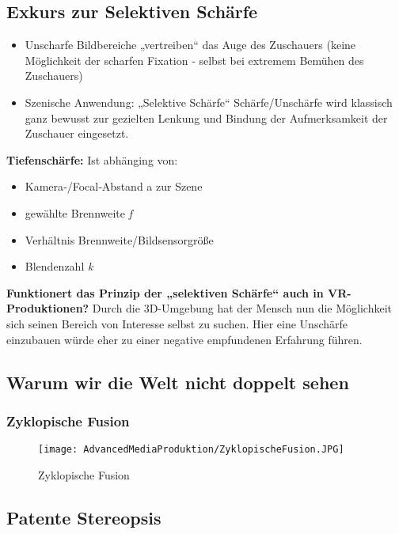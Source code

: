\subsection{Exkurs zur Selektiven Schärfe}

\begin{itemize}
\item Unscharfe Bildbereiche „vertreiben“ das Auge des Zuschauers
(keine Möglichkeit der scharfen Fixation ‐ selbst bei extremem Bemühen des Zuschauers)
\item Szenische Anwendung: „Selektive Schärfe“
Schärfe/Unschärfe wird klassisch ganz bewusst zur gezielten Lenkung und Bindung der Aufmerksamkeit der Zuschauer eingesetzt.
\end{itemize}

\textbf{Tiefenschärfe:}
Ist abhänging von: 
\begin{itemize}
\item Kamera‐/Focal‐Abstand a zur Szene
\item gewählte Brennweite \textit{f} 
\item Verhältnis Brennweite/Bildsensorgröße
\item Blendenzahl \textit{k} 
\end{itemize} 

\textbf{Funktionert das Prinzip der „selektiven Schärfe“ auch in VR-Produktionen?}
Durch die 3D-Umgebung hat der Mensch nun die Möglichkeit sich seinen Bereich von Interesse selbst zu suchen. Hier eine Unschärfe einzubauen würde eher zu einer negative empfundenen Erfahrung führen. \\

\subsection{Warum wir die Welt nicht doppelt sehen}

\subsubsection{Zyklopische Fusion}

\begin{figure}[H] 
  \centering
	\texttt{[image: AdvancedMediaProduktion/ZyklopischeFusion.JPG]} 
  \caption{Zyklopische Fusion}
  \label{fig:Bild1}
\end{figure}

\subsection{Patente Stereopsis}

